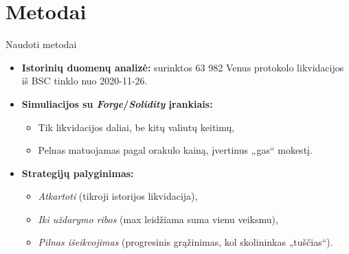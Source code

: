 \documentclass[12pt]{beamer}
\begin{document}
\section{Metodai}
\begin{frame}{Naudoti metodai}
  \begin{itemize}
    \item \textbf{Istorinių duomenų analizė:} surinktos 63 982 Venus protokolo likvidacijos iš BSC tinklo nuo 2020-11-26.
    \item \textbf{Simuliacijos su \textit{Forge}/\textit{Solidity} įrankiais:} 
      \begin{itemize}
        \item Tik likvidacijos daliai, be kitų valiutų keitimų,
        \item Pelnas matuojamas pagal orakulo kainą, įvertinus „gas“ mokestį.
      \end{itemize}
    \item \textbf{Strategijų palyginimas:} 
      \begin{itemize}
        \item \emph{Atkartoti} (tikroji istorijos likvidacija),
        \item \emph{Iki uždarymo ribos} (max leidžiama suma vienu veiksmu),
        \item \emph{Pilnas išeikvojimas} (progresinis grąžinimas, kol skolininkas „tuščias“).
      \end{itemize}
  \end{itemize}
\end{frame}
\end{document}
